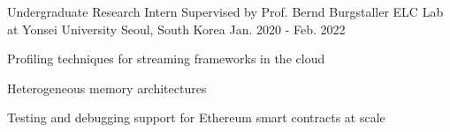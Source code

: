 

\begin{cventries}

  \cventry
    {Undergraduate Research Intern Supervised by Prof. Bernd Burgstaller} %
    {ELC Lab at Yonsei University} %
    {Seoul, South Korea} %
    {Jan. 2020 - Feb. 2022} %
    {
      \begin{cvitems} %
        \item {Profiling techniques for streaming frameworks in the cloud}
        \item {Heterogeneous memory architectures}
        \item {Testing and debugging support for Ethereum smart contracts at scale}
      \end{cvitems}
    }

\end{cventries}
